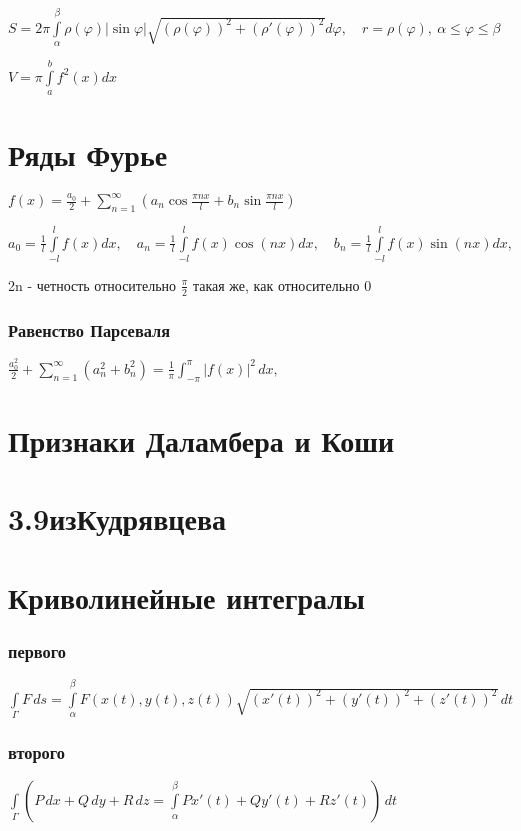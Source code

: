 $S=2\pi \int \limits _{\alpha }^{\beta }\rho (\varphi )|\sin \varphi |{\sqrt  {\left(\rho (\varphi )\right)^{2}+\left(\rho '(\varphi )\right)^{2}}}d\varphi, \quad r=\rho (\varphi ),\ \alpha \leq \varphi \leq \beta $

$V=\pi \int \limits _{a}^{b}f^{2}(x)dx$


\section{Ряды Фурье}

$f(x)=\frac{a_0}{2} + \sum^{\infty}_{n=1} (a_n \cos \frac{\pi n x}{l} + b_n \sin \frac{\pi n x}{l})$

$a_0= \frac{1}{l}\int\limits_{-l}^{l}f(x)dx, \quad a_n= \frac{1}{l}\int\limits_{-l}^{l}f(x)\cos(nx)dx, \quad b_n= \frac{1}{l}\int\limits_{-l}^{l}f(x)\sin(nx)dx,$

2n - четность относительно $\frac {\pi}{2}$ такая же, как относительно 0

\subsubsection{Равенство Парсеваля} 
$\frac {a_0^2}{2} + \sum _{{n=1}}^{\infty }(a_n^2 +b_n^2)={\frac  {1}{\pi }}\int _{{-\pi }}^{\pi }|f(x)|^{2}\,dx,$

\section{Признаки Даламбера и Коши}

\section{3.9изКудрявцева}

\section{Криволинейные интегралы}
\subsubsection{первого}
$\int\limits_{\Gamma} F\, ds = \int\limits_{\alpha}^{\beta} F(x(t),y(t),z(t))\sqrt{(x'(t))^2+(y'(t))^2+(z'(t))^2}\,dt$
\subsubsection{второго}
$\int\limits_{\Gamma} \left(P\,dx+Q\,dy+R\,dz=\int\limits_{\alpha}^{\beta} P x'(t)+ Q y'(t)+ R z'(t)\right)\,dt$
